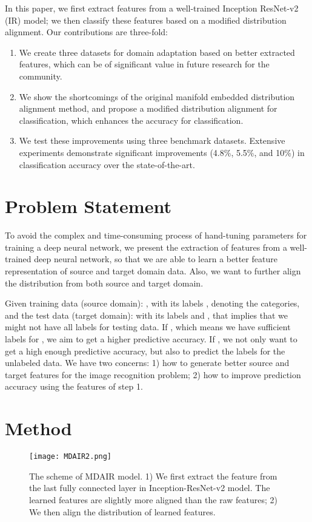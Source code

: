 \documentclass[10pt, conference, compsocconf]{IEEEtran}
\begin{document}
In this paper, we first extract features from a well-trained Inception ResNet-v2 (IR) model; we then classify these features based on a modified distribution alignment. Our contributions are three-fold:
\begin{enumerate}
    \item We create three datasets for domain adaptation based on better extracted features, which can be of significant value in future research for the community. 
    \item We show the shortcomings of the original manifold embedded distribution  alignment method, and propose a modified distribution alignment for classification, which enhances the accuracy for  classification.
    \item We test these improvements using three benchmark datasets. Extensive experiments demonstrate significant improvements (4.8\%, 5.5\%, and 10\%) in classification accuracy over the state-of-the-art.  
\end{enumerate} 
\section{Problem Statement} \label{sec:class}

To avoid the complex and time-consuming process of hand-tuning  parameters for training a deep neural network, we present the extraction of features from a well-trained deep neural network, so that we are able to learn a better feature representation of source and target domain data. Also, we want to further align the distribution from both source and target domain. 


Given training data (source domain): , with its labels , denoting the  categories, and the test data (target domain):  with its labels  and ,  that implies that we might not have all labels for testing data. If , which means we have sufficient labels for , we aim to get a higher predictive accuracy. If , we not only want to get a high enough predictive accuracy, but also to predict the labels for the unlabeled data. We have two concerns: 1) how to generate better source  and target  features for the image recognition problem; 2) how to improve prediction accuracy using the features of step 1. 

\section{Method}

\begin{figure}[t]
\centering
\texttt{[image: MDAIR2.png]}
\caption{The scheme of MDAIR model. 1) We first extract the feature from the last fully connected layer in Inception-ResNet-v2 model. The learned features are slightly more aligned than the raw features; 2)  We then align the distribution of learned features.}
\label{fig:DAIR}
\end{figure}
\end{document}
